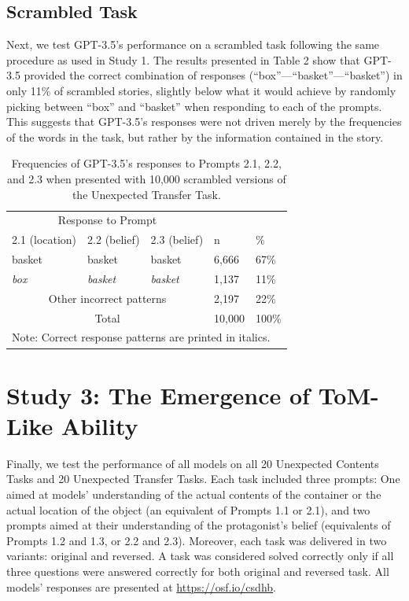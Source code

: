 \documentclass[11pt]{article}
\begin{document}
\subsection*{Scrambled Task}
Next, we test GPT-3.5’s performance on a scrambled task following the same procedure as used in Study 1. The results presented in Table 2 show that GPT-3.5 provided the correct combination of responses (“box”—“basket”—“basket”) in only 11\% of scrambled stories, slightly below what it would achieve by randomly picking between “box” and “basket” when responding to each of the prompts. This suggests that GPT-3.5’s responses were not driven merely by the frequencies of the words in the task, but rather by the information contained in the story.
   \begin{table}
\centering
\begin{tabular}{lllll} 
\hline
\multicolumn{3}{c}{Response to Prompt}             &        &                  \\ 
\cline{1-3}
2.1 (location) & 2.2 (belief)    & 2.3 (belief)    & n      & \%               \\ 
\hline
basket         & basket          & basket          & 6,666  & 67\%             \\
\textit{box}   & \textit{basket} & \textit{basket} & 1,137  & 11\%             \\
\multicolumn{3}{c}{Other incorrect patterns}       & 2,197  & 22\%             \\ 
\cline{4-5}
\multicolumn{3}{c}{Total}                          & 10,000 & 100\%            \\ 
\hline
\multicolumn{5}{l}{Note: Correct response patterns are printed in italics.}   
\end{tabular}
\caption{Frequencies of GPT-3.5’s responses to Prompts 2.1, 2.2, and 2.3 when presented with 10,000 scrambled versions of the Unexpected Transfer Task.}
\end{table}
\section*{Study 3: The Emergence of ToM-Like Ability}

Finally, we test the performance of all models on all 20 Unexpected Contents Tasks and 20 Unexpected Transfer Tasks. Each task included three prompts: One aimed at models’ understanding of the actual contents of the container or the actual location of the object (an equivalent of Prompts 1.1 or 2.1), and two prompts aimed at their understanding of the protagonist’s belief (equivalents of Prompts 1.2 and 1.3, or 2.2 and 2.3). Moreover, each task was delivered in two variants: original and reversed. A task was considered solved correctly only if all three questions were answered correctly for both original and reversed task. All models’ responses are presented at \url{https://osf.io/csdhb}.
\end{document}
